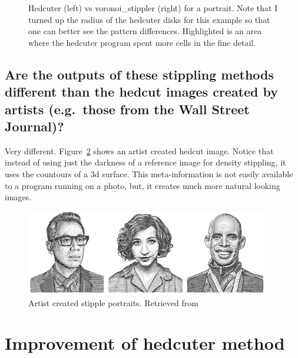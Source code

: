 \documentclass[11pt]{article}
\begin{document}
\begin{figure}[H]
  \centering
  \begin{minipage}{.5\textwidth}
    \centering
    
  \end{minipage}%
  \begin{minipage}{.5\textwidth}
    \centering
    
  \end{minipage}
  \caption{Hedcuter (left) vs voronoi\_stippler (right) for a
    portrait. Note that I turned up the radius of the hedcuter disks
    for this example so that one can better see the pattern
    differences. Highlighted is an area where the hedcuter program
    spent more cells in the fine detail.}\label{c3}
\end{figure}

\subsection{Are the outputs of these stippling methods different than
  the hedcut images created by artists (e.g.\ those from the Wall
  Street Journal)?}

Very different. Figure~\ref{faces} shows an artist created hedcut
image. Notice that instead of using just the darkness of a reference
image for density stippling, it uses the countours of a 3d
surface. This meta-information is not easily available to a program
running on a photo, but, it creates much more natural looking images.

\begin{figure}[H]
  \centering
  \begin{minipage}{1\textwidth}
    \centering
    \includegraphics[width=0.95\textwidth]{faces.jpg}
  \end{minipage}
  \caption{Artist created stipple portraits. Retrieved
    from~\cite{facesimg}}\label{faces}
\end{figure}


\section{Improvement of hedcuter method}



\end{document}
